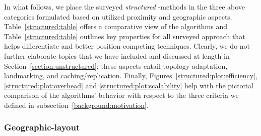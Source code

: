 In what follows, we place the surveyed \emph{structured} \p-methods in 
the three above categories formulated based on 
utilized proximity and geographic aspects.
Table~\ref{structured:table} offers a comparative view
of the algorithms and
Table~\ref{structured:table} outlines key properties for all surveyed approach 
that helps differentiate and better position competing techniques.
Clearly, we do not further elaborate topics that we have included and discussed 
at length in Section~\ref{section:unstructured}; these aspects entail 
topology adaptation, landmarking, and caching/replication.
Finally, Figures~\ref{structured:plot:efficiency}, \ref{structured:plot:overhead}
and \ref{structured:plot:scalability} help with the pictorial comparison
of the algorithms' behavior with respect to the three 
criteria we defined in subsection~\ref{background:motivation}.

\subsubsection{Geographic-layout} \label{section:geographic_layout}


